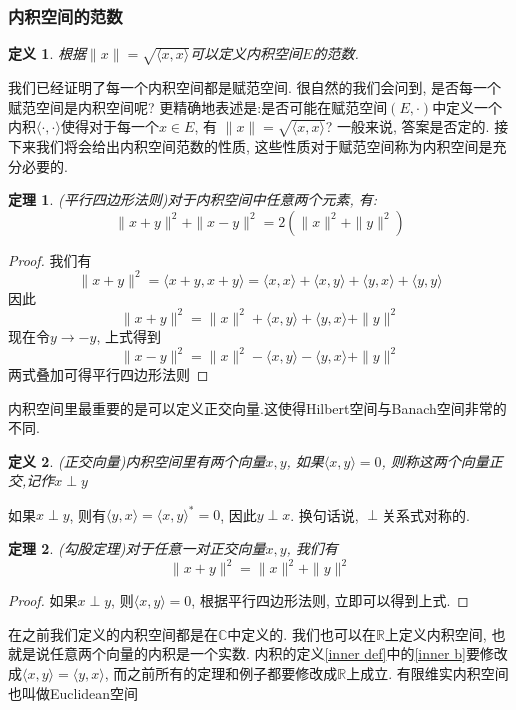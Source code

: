 \documentclass{book}
\newtheorem{definition}{\hspace{2em}定义}[section]
\newtheorem{theorem}{\hspace{2em}定理}[section]
\newtheorem{proof}{证明}[section]
\begin{document}
\subsubsection*{内积空间的范数}
\begin{definition}
  根据$\|x\|=\sqrt{\langle x,x\rangle}$可以定义内积空间$E$的范数.
\end{definition}
我们已经证明了每一个内积空间都是赋范空间. 很自然的我们会问到, 是否每一个赋范空间是内积空间呢? 更精确地表述是:是否可能在赋范空间$(E,\cdot)$中定义一个内积$\langle\cdot,\cdot\rangle$使得对于每一个$x\in E$, 有 $\|x\|=\sqrt{\langle x,x\rangle}$? 一般来说, 答案是否定的. 接下来我们将会给出内积空间范数的性质, 这些性质对于赋范空间称为内积空间是充分必要的.
\begin{theorem}
  (平行四边形法则)对于内积空间中任意两个元素, 有:
  \begin{equation*}
    \|x+y\|^2+\|x-y\|^2=2(\|x\|^2+\|y\|^2)
  \end{equation*}
\end{theorem}
\begin{proof}
  我们有
  \begin{equation*}
    \|x+y\|^2=\langle x+y,x+y\rangle=\langle x,x\rangle+\langle x,y\rangle+\langle y,x\rangle+\langle y,y\rangle
  \end{equation*}
  因此
  \begin{equation*}
    \|x+y\|^2=\|x\|^2+\langle x,y\rangle+\langle y,x\rangle+\|y\|^2
  \end{equation*}
  现在令$y\to -y$, 上式得到
  \begin{equation*}
    \|x-y\|^2=\|x\|^2-\langle x,y\rangle-\langle y,x\rangle+\|y\|^2
  \end{equation*}
  两式叠加可得平行四边形法则
\end{proof}
内积空间里最重要的是可以定义正交向量.这使得Hilbert空间与Banach空间非常的不同.
\begin{definition}
  (正交向量)内积空间里有两个向量$x,y$, 如果$\langle x,y\rangle=0$, 则称这两个向量正交,记作$x\perp y$
\end{definition}
如果$x\perp y$, 则有$\langle y,x\rangle=\langle x,y\rangle^*=0$, 因此$y\perp x$. 换句话说, $\perp$关系式对称的.
\begin{theorem}
  (勾股定理)对于任意一对正交向量$x,y$, 我们有
  \begin{equation*}
    \|x+y\|^2=\|x\|^2+\|y\|^2
  \end{equation*}
\end{theorem}
\begin{proof}
  如果$x\perp y$, 则$\langle x,y\rangle=0$, 根据平行四边形法则, 立即可以得到上式.
\end{proof}
在之前我们定义的内积空间都是在$\mathbb{C}$中定义的. 我们也可以在$\mathbb{R}$上定义内积空间, 也就是说任意两个向量的内积是一个实数. 内积的定义\ref{inner def}中的\ref{inner b}要修改成$\langle x,y\rangle=\langle y,x\rangle$, 而之前所有的定理和例子都要修改成$\mathbb{R}$上成立. 有限维实内积空间也叫做Euclidean空间
\end{document}
